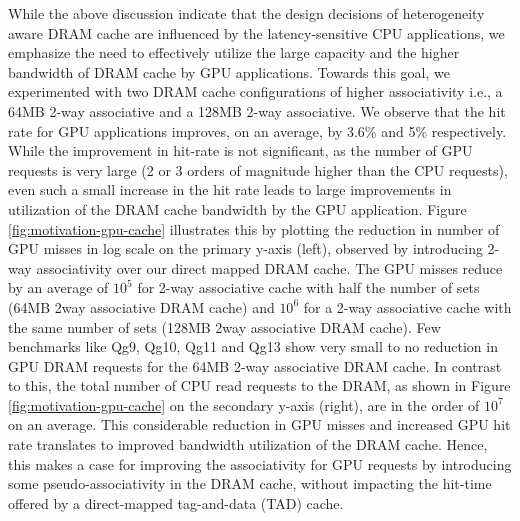 
While the above discussion indicate that the design decisions of heterogeneity aware DRAM cache are influenced by the latency-sensitive CPU applications, we emphasize the need to effectively utilize the large capacity and the higher bandwidth of DRAM cache by GPU applications. Towards this goal, we experimented with two DRAM cache configurations of higher associativity i.e., a 64MB 2-way associative and a 128MB 2-way associative. We observe that the hit rate for GPU applications improves, on an average, by 3.6\% and 5\% respectively. While the improvement in hit-rate is not significant, as the number of GPU requests is very large (2 or 3 orders of magnitude higher than the CPU requests), even such a small increase in the hit rate leads to large improvements in utilization of the DRAM cache bandwidth by the GPU application. Figure \ref{fig:motivation-gpu-cache} illustrates this by plotting the reduction in number of GPU misses in log scale on the primary y-axis (left), observed by introducing 2-way associativity over our direct mapped DRAM cache. The GPU misses reduce by an average of $10^5$ for 2-way associative cache with half the number of sets (64MB 2way associative DRAM cache) and $10^6$ for a 2-way associative cache with the same number of sets (128MB 2way associative DRAM cache). Few benchmarks like Qg9, Qg10, Qg11 and Qg13 show very small to no reduction in GPU DRAM requests for the 64MB 2-way associative DRAM cache. 
In contrast to this, the total number of CPU read requests to the DRAM, as shown in Figure \ref{fig:motivation-gpu-cache} on the secondary y-axis (right), are in the order of $10^7$ on an average. This considerable reduction in GPU misses and increased GPU hit rate translates to improved bandwidth utilization of the DRAM cache. Hence, this makes a case for improving the associativity for GPU requests by introducing some pseudo-associativity in the DRAM cache, without impacting the hit-time offered by a direct-mapped tag-and-data (TAD) cache.

